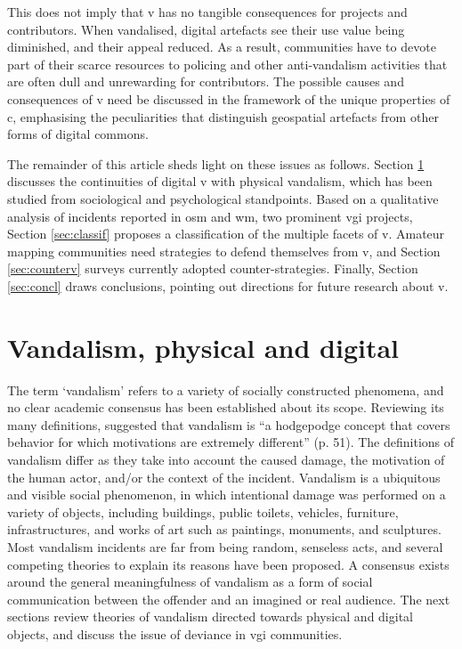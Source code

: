 \documentclass{article} \usepackage{graphicx,xspace}
\begin{document}
This does not imply that \gls{v} has no tangible consequences for projects and contributors.
When vandalised, digital artefacts see their use value being diminished, and their appeal reduced.
As a result, communities have to devote part of their scarce resources to policing and other anti-vandalism activities that are often dull and unrewarding for contributors.
The possible causes and consequences of \gls{v} need be discussed in the framework of the unique properties of \gls{c}, emphasising the peculiarities that distinguish geospatial artefacts from other forms of digital commons.


The remainder of this article sheds light on these issues as follows.
Section \ref{sec:vanda} discusses the continuities of digital \gls{v} with physical vandalism, which has been studied from sociological and psychological standpoints.
Based on a qualitative analysis of incidents reported in \gls{osm} and \gls{wm}, two prominent \gls{vgi} projects, Section \ref{sec:classif} proposes a classification of the multiple facets of \gls{v}.
Amateur mapping communities need strategies to defend themselves from \gls{v}, and Section \ref{sec:counterv} surveys currently adopted counter-strategies.
Finally, Section \ref{sec:concl} draws conclusions, pointing out directions for future research about \gls{v}.

\section{Vandalism, physical and digital}
\label{sec:vanda}


The term `vandalism' refers to a variety of socially constructed phenomena, and no clear academic consensus has been established about its scope.
Reviewing its many definitions, \cite{moser:1992:vandalism} suggested that vandalism is ``a hodgepodge concept that covers behavior for which motivations are extremely different'' (p. 51).
The definitions of vandalism differ as they take into account the caused damage, the motivation of the human actor, and/or the context of the incident.
Vandalism is a ubiquitous and visible social phenomenon, in which intentional damage was performed on a variety of objects, including buildings, public toilets, vehicles, furniture, infrastructures, and works of art such as paintings, monuments, and sculptures.
Most vandalism incidents are far from being random, senseless acts, and several competing theories to explain its reasons have been proposed.
A consensus exists around the general meaningfulness of vandalism as a form of social communication between the offender and an imagined or real audience.
The next sections review theories of vandalism directed towards physical and digital objects, and discuss the issue of deviance in \gls{vgi} communities. 
\end{document}
